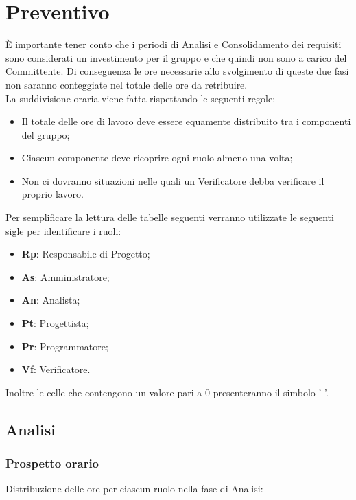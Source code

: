 \section{Preventivo}
È importante tener conto che i periodi di Analisi e Consolidamento dei requisiti sono considerati un investimento per il gruppo e che quindi non sono a carico del Committente.
Di conseguenza le ore necessarie allo svolgimento di queste due fasi non saranno conteggiate nel totale delle ore da retribuire. \\

La suddivisione oraria viene fatta rispettando le seguenti regole:
\begin{itemize}
	\item Il totale delle ore di lavoro deve essere equamente distribuito tra i componenti del gruppo;
	\item Ciascun componente deve ricoprire ogni ruolo almeno una volta;
	\item Non ci dovranno situazioni nelle quali un Verificatore debba verificare il proprio lavoro.
\end{itemize}

Per semplificare la lettura delle tabelle seguenti verranno utilizzate le seguenti sigle per identificare i ruoli: 
\begin{itemize}
	\item \textbf{Rp}: Responsabile di Progetto;
	\item \textbf{As}: Amministratore;
	\item \textbf{An}: Analista;
	\item \textbf{Pt}: Progettista;
	\item \textbf{Pr}: Programmatore;
	\item \textbf{Vf}: Verificatore.
\end{itemize}
Inoltre le celle che contengono un valore pari a 0 presenteranno il simbolo '-'.

\subsection{Analisi}
	\subsubsection{Prospetto orario}
		Distribuzione delle ore per ciascun ruolo nella fase di Analisi:
		
